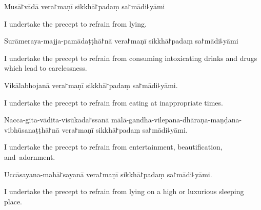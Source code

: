 \clearpage

\begin{precept}
  \setcounter{enumi}{3}
  \item Musā꜓vādā vera꜓maṇī sikkhā꜓padaṃ sa꜓mādi꜕yāmi
\end{precept}

\begin{english}
  I undertake the precept to refrain from lying.
\end{english}

\begin{precept}
  \setcounter{enumi}{4}
  \item Surāmeraya-majja-pamādaṭṭhā꜓nā vera꜓maṇī sikkhā꜓padaṃ sa꜓mādi꜕yāmi
\end{precept}

\begin{english}
  I undertake the precept to refrain from consuming intoxicating drinks and drugs which lead to carelessness.
\end{english}

\begin{precept}
  \setcounter{enumi}{5}
  \item Vikālabhojanā vera꜓maṇī sikkhā꜓padaṃ sa꜓mādi꜕yāmi.
\end{precept}

\begin{english}
  I undertake the precept to refrain from eating at inappropriate times.
\end{english}

\begin{precept}
  \setcounter{enumi}{6}
  \item Nacca-gīta-vādita-visūkada꜓ssanā mālā-gandha-vilepana-dhāraṇa-maṇḍana-vibhūsanaṭṭhā꜓nā vera꜓maṇī sikkhā꜓padaṃ sa꜓mādi꜕yāmi.
\end{precept}

\begin{english}
  I undertake the precept to refrain from entertainment, beautification, and~adornment.
\end{english}

\begin{precept}
  \setcounter{enumi}{7}
  \item Uccāsayana-mahā꜓sayanā vera꜓maṇī sikkhā꜓padaṃ sa꜓mādi꜕yāmi.
\end{precept}

\begin{english}
  I undertake the precept to refrain from lying on a high or luxurious sleeping place.
\end{english}


